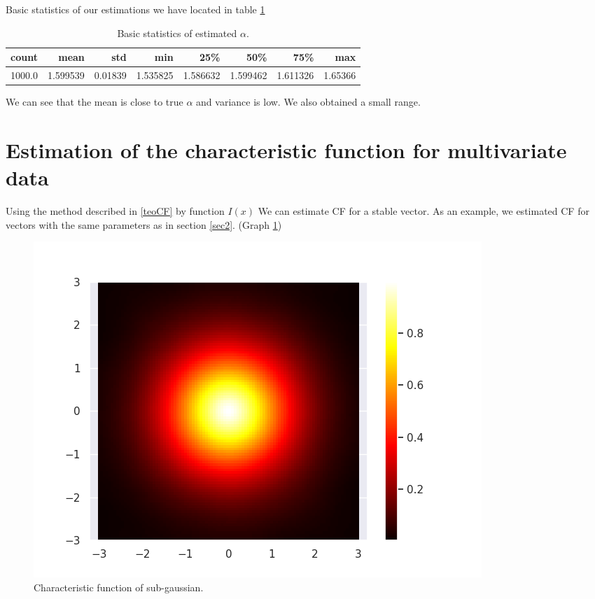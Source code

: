 \documentclass{article}
\begin{document}
	Basic statistics of our estimations we have located in table \ref{tab2}
	
	\begin{table}[H]
		\centering
		\begin{tabular}{rrrrrrrr}
			\hline
			count &      mean &      std &       min &       25\% &       50\% &       75\% &      max \\
			\hline
			1000.0 &  1.599539 &  0.01839 &  1.535825 &  1.586632 &  1.599462 &  1.611326 &  1.65366 \\
			\hline
		\end{tabular}
		\caption{Basic statistics of estimated $\alpha$.}\label{tab2}
	\end{table}
	
	We can see that the mean is close to true $\alpha$ and variance is low. We also obtained a small range.
	
	\section{Estimation of the characteristic function for multivariate data}
	Using the method described in \ref{teoCF} by function $I(x)$ We can estimate CF for a stable vector.
	As an example, we estimated CF for vectors with the same parameters as in section \ref{sec2}. (Graph \ref{12})
	\begin{figure}[H]
		\centering
		\includegraphics[width=1\linewidth]{images/ex_4_cf_sub_gaussian_SaS}
		\caption{Characteristic function of sub-gaussian.}\label{12}
	\end{figure}
	
\end{document}
